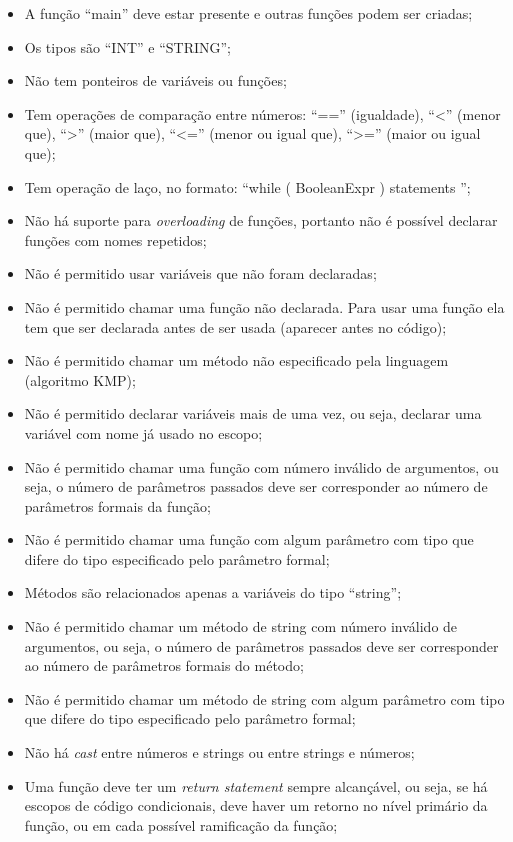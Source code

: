 \documentclass[12pt]{article}
\begin{document}
\begin{itemize}
	\item A função ``main'' deve estar presente e outras funções podem ser criadas;
	\item Os tipos são ``INT'' e ``STRING'';
	\item Não tem ponteiros de variáveis ou funções;
	\item Tem operações de comparação entre números: ``=='' (igualdade), ``<'' (menor que), ``>'' (maior que), ``<='' (menor ou igual que), ``>='' (maior ou igual que);
	\item Tem operação de laço, no formato: ``while ( BooleanExpr ) { statements }'';
	\item Não há suporte para \textit{overloading} de funções, portanto não é possível declarar funções com nomes repetidos;
	\item Não é permitido usar variáveis que não foram declaradas;
	\item Não é permitido chamar uma função não declarada. Para usar uma função ela tem que ser declarada antes de ser usada (aparecer antes no código);
	\item Não é permitido chamar um método não especificado pela linguagem (algoritmo KMP);
	\item Não é permitido declarar variáveis mais de uma vez, ou seja, declarar uma variável com nome já usado no escopo;
	\item Não é permitido chamar uma função com número inválido de argumentos, ou seja, o número de parâmetros passados deve ser corresponder ao número de parâmetros formais da função;
	\item Não é permitido chamar uma função com algum parâmetro com tipo que difere do tipo especificado pelo parâmetro formal;
	\item Métodos são relacionados apenas a variáveis do tipo ``string'';
	\item Não é permitido chamar um método de string com número inválido de argumentos, ou seja, o número de parâmetros passados deve ser corresponder ao número de parâmetros formais do método;
	\item Não é permitido chamar um método de string com algum parâmetro com tipo que difere do tipo especificado pelo parâmetro formal;
	\item Não há \textit{cast} entre números e strings ou entre strings e números;
	\item Uma função deve ter um \textit{return statement} sempre alcançável, ou seja, se há escopos de código condicionais, deve haver um retorno no nível primário da função, ou em cada possível ramificação da função;

\end{itemize}
\end{document}
